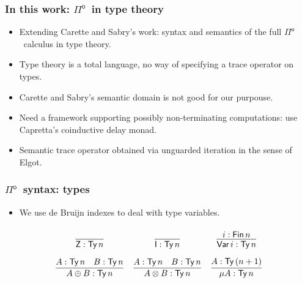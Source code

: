 \documentclass[12pt,t]{beamer}
\newcommand{\Pio}{\ensuremath{\mathsf{\Pi}^{\mathsf{o}}}}
\newcommand{\Ty}{\mathsf{Ty}}
\newcommand{\Var}{\mathsf{Var}}
\newcommand{\Z}{\mathsf{Z}}
\newcommand{\I}{\mathsf{I}}
\begin{document}
\begin{frame}
  
  \frametitle{In this work: \Pio\ in type theory}

  \begin{itemize}
  \item Extending Carette and Sabry's work: syntax and semantics of
    the full \Pio\ calculus in type theory.
  \item Type theory is a total language, no way of specifying a trace
    operator on types.
  \item Carette and Sabry's semantic domain is not good for our
    purpouse.
    \pause
    \vspace{\fill}
  \item Need a framework supporting possibly non-terminating
    computations: use Capretta's coinductive delay monad.
   \item Semantic trace operator obtained via unguarded iteration in
     the sense of Elgot.
  \end{itemize}
  
\end{frame}

\begin{frame}

  \frametitle{\Pio\ syntax: types}
  \begin{itemize}
    \item We use de Bruijn indexes to deal with type variables.
  \end{itemize}
  \[
  \arraycolsep=6pt\def\arraystretch{2.8}
  \begin{array}{ccc}
    \infer{\Z : \Ty\,n}{} 
    & \infer{\I : \Ty\,n}{}
    & \infer{\Var\,i : \Ty\,n}{i : \mathsf{Fin}\,n}  \\
    \infer{A \oplus B : \Ty\,n}{A : \Ty\,n & B : \Ty\,n}
    & \infer{A \otimes B : \Ty\,n}{A : \Ty\,n & B : \Ty\,n}
    & \infer{\mu A : \Ty\,n}{A : \Ty\,(n+1)}
  \end{array}
  \]
  
\end{frame}
\end{document}
